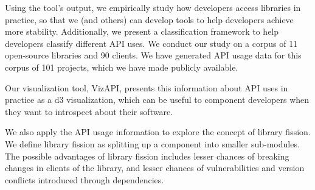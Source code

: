 Using the tool's output, we empirically study how developers access libraries in practice, so that we (and others) can develop tools to help developers achieve more stability. Additionally, we present a classification framework to help developers classify different API uses. We conduct our study on a corpus of 11 open-source libraries and 90 clients. We have generated API usage data for this corpus of 101 projects, which we have made publicly available. 

Our visualization tool, VizAPI, presents this information about API uses in practice as a d3 visualization, which can be useful to component developers when they want to introspect about their software. 

We also apply the API usage information to explore the concept of library fission. We define library fission as splitting up a component into smaller sub-modules. The possible advantages of library fission includes lesser chances of breaking changes in clients of the library, and lesser chances of vulnerabilities and version conflicts introduced through dependencies.
